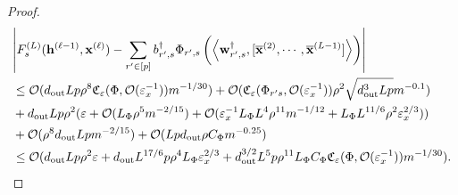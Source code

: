 \begin{claim}
\begin{proof}
\begin{align*}
				&\abs{ F_s^{(L)}(\mathbf{h}^{(\ell-1)}, \mathbf{x}^{(\ell)}) - \sum_{r' \in [p]}  b_{r', s}^{\dagger} \Phi_{r', s} \left(\left\langle \mathbf{w}_{r', s}^{\dagger}, [\overline{\mathbf{x}}^{(2)}, \cdots, \overline{\mathbf{x}}^{(L-1)}]\right\rangle\right) } \\& \le \mathcal{O}(d_{\mathrm{out}} Lp\rho^8  \mathfrak{C}_{\varepsilon}(\Phi, \mathcal{O}(\varepsilon_x^{-1}))  m^{-1/30}) + \mathcal{O}(\mathfrak{C}_{\varepsilon}(\Phi_{r' s}, \mathcal{O}(\varepsilon_x^{-1})) \rho^2 \sqrt{d_{\mathrm{out}} ^3Lp} m^{-0.1}) \\& + d_{\mathrm{out}} Lp \rho^2 (\varepsilon + \mathcal{O}( L_{\Phi}\rho^5 m^{-2/15}) + \mathcal{O}(\varepsilon_x^{-1} L_{\Phi} L^4 \rho^{11} m^{-1/12} +  L_{\Phi} L^{11/6} \rho^2 \varepsilon_x^{2/3})) \\& + \mathcal{O}(\rho^8d_{\mathrm{out}} Lp  m^{-2/15})  + \mathcal{O}(Lpd_{\mathrm{out}}  \rho C_{\Phi} m^{-0.25}) \\&
				\le \mathcal{O}(d_{\mathrm{out}} Lp\rho^2 \varepsilon + d_{\mathrm{out}} L^{17/6} p \rho^4 L_{\Phi} \varepsilon_x^{2/3} + d_{\mathrm{out}} ^{3/2} L^5 p \rho^{11} L_{\Phi} C_{\Phi}  \mathfrak{C}_{\varepsilon}(\Phi, \mathcal{O}(\varepsilon_x^{-1}))  m^{-1/30} ) .
			\end{align*}
			\endgroup
		

\end{proof}
\end{claim}
